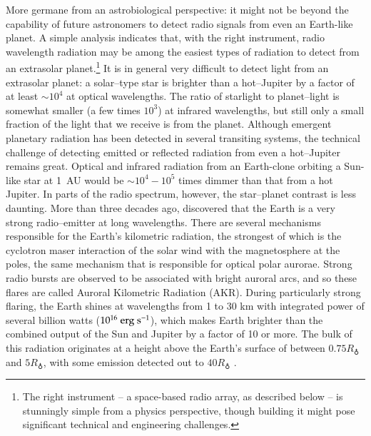 More germane from an astrobiological perspective: it might not be
beyond the capability of future astronomers to detect radio signals
from even an Earth-like planet.  A simple analysis indicates that,
with the right instrument, radio wavelength radiation may be among the
easiest types of radiation to detect from an extrasolar
planet.\footnote{The right instrument -- a space-based radio array, as
  described below -- is stunningly simple from a physics perspective,
  though building it might pose significant technical and engineering
  challenges.}  It is in general very difficult to detect light from
an extrasolar planet: a solar--type star is brighter than a
hot--Jupiter by a factor of at least $\sim 10^4$ at optical
wavelengths.  The ratio of starlight to planet--light is somewhat
smaller (a few times $10^3$) at infrared wavelengths, but still only a
small fraction of the light that we receive is from the planet.
Although emergent planetary radiation has been detected in several
transiting systems, the technical challenge of detecting emitted or
reflected radiation from even a hot--Jupiter remains great.  Optical
and infrared radiation from an Earth-clone orbiting a Sun-like star at
1~AU would be $\sim 10^4 - 10^5$ times dimmer than that from a hot
Jupiter.  In parts of the radio spectrum, however, the star--planet
contrast is less daunting.  More than three decades ago,
\citet{gurnett1975} discovered that the Earth is a very strong
radio--emitter at long wavelengths.  There are several mechanisms
responsible for the Earth's kilometric radiation, the strongest of
which is the cyclotron maser interaction of the solar wind with the
magnetosphere at the poles, the same mechanism that is responsible for
optical polar aurorae.  Strong radio bursts are observed to be
associated with bright auroral arcs, and so these flares are called
Auroral Kilometric Radiation (AKR).  During particularly strong
flaring, the Earth shines at wavelengths from 1 to 30 km with
integrated power of several billion watts ($10^{16}
{\rm~erg~s^{-1}}$), which makes Earth brighter than the combined
output of the Sun and Jupiter by a factor of 10 or more.  The bulk of
this radiation originates at a height above the Earth's surface of
between $0.75 R_\earth$ and $5 R_\earth$, with some emission detected
out to $40 R_\earth$ \citep{mutel_et_al2004}.

